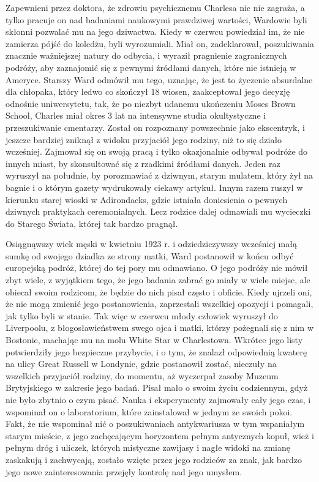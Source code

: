Zapewnieni przez doktora, że zdrowiu psychicznemu Charlesa nic nie zagraża, a tylko pracuje on nad badaniami naukowymi prawdziwej wartości, Wardowie byli skłonni pozwalać mu na jego dziwactwa. Kiedy w czerwcu powiedział im, że nie zamierza pójść do koledżu, byli wyrozumiali. Miał on, zadeklarował, poszukiwania znacznie ważniejszej natury do odbycia, i wyraził pragnienie zagranicznych podróży, aby zaznajomić się z pewnymi źródłami danych, które nie istnieją w Ameryce. Starszy Ward odmówił mu tego, uznając, że jest to życzenie absurdalne dla chłopaka, który ledwo co skończył 18 wiosen, zaakceptował jego decyzję odnośnie uniwersytetu, tak, że po niezbyt udanemu ukończeniu Moses Brown School, Charles miał okres 3 lat na intensywne studia okultystyczne i przeszukiwanie cmentarzy. Został on rozpoznany powszechnie jako ekscentryk, i jeszcze bardziej zniknął z widoku przyjaciół jego rodziny, niż to się działo wcześniej. Zajmował się on swoją pracą i tylko okazjonalnie odbywał podróże do innych miast, by skonsultować się z rzadkimi źródłami danych. Jeden raz wyruszył na południe, by porozmawiać z dziwnym, starym mulatem, który żył na bagnie i o którym gazety wydrukowały ciekawy artykuł. Innym razem ruszył w kierunku starej wioski w Adirondacks, gdzie istniała doniesienia o pewnych dziwnych praktykach ceremonialnych. Lecz rodzice dalej odmawiali mu wycieczki do Starego Świata, której tak bardzo pragnął. 

Osiągnąwszy wiek męski w kwietniu 1923 r. i odziedziczywszy wcześniej małą sumkę od swojego dziadka ze strony matki, Ward postanowił w końcu odbyć europejską podróż, której do tej pory mu odmawiano. O jego podróży nie mówił zbyt wiele, z wyjątkiem tego, że jego badania zabrać go miały w wiele miejsc, ale obiecał swoim rodzicom, że będzie do nich pisał często i obficie. Kiedy ujrzeli oni, że nie mogą zmienić jego postanowienia, zaprzestali wszelkiej opozycji i pomagali, jak tylko byli w stanie. Tak więc w czerwcu młody człowiek wyruszył do Liverpoolu, z błogosławieństwem swego ojca i matki, którzy pożegnali się z nim w Bostonie, machając mu na molu White Star w Charlestown. Wkrótce jego listy potwierdziły jego bezpieczne przybycie, i o tym, że znalazł odpowiednią kwaterę na ulicy Great Russell w Londynie, gdzie postanowił zostać, nieczuły na wszelkich przyjaciół rodziny, do momentu, aż wyczerpał zasoby Muzeum Brytyjskiego w zakresie jego badań. Pisał mało o swoim życiu codziennym, gdyż nie było zbytnio o czym pisać. Nauka i eksperymenty zajmowały cały jego czas, i wspominał on o laboratorium, które zainstalował w jednym ze swoich pokoi. Fakt, że nie wspominał nić o poszukiwaniach antykwariusza w tym wspaniałym starym mieście, z jego zachęcającym horyzontem pełnym antycznych kopuł, wież i pełnym dróg i uliczek, których mistyczne zawijasy  i nagłe widoki na zmianę zaskakują i zachwycają, zostało wzięte przez jego rodziców za znak, jak bardzo jego nowe zainteresowania przejęły kontrolę nad jego umysłem.

